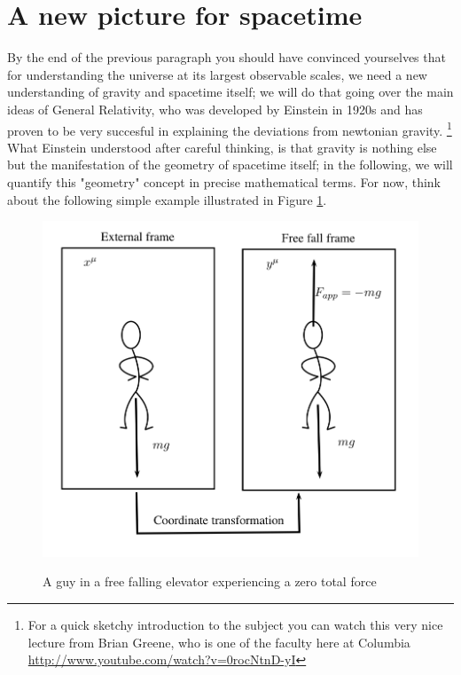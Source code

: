 \section{A new picture for spacetime}
By the end of the previous paragraph you should have convinced yourselves that for understanding the universe at its largest observable scales, we need a new understanding of gravity and spacetime itself; we will do that going over the main ideas of General Relativity, who was developed by Einstein in 1920s and has proven to be very succesful in explaining the deviations from newtonian gravity. \footnote{For a quick sketchy introduction to the subject you can watch this very nice lecture from Brian Greene, who is one of the faculty here at Columbia \url{http://www.youtube.com/watch?v=0rocNtnD-yI}} What Einstein understood after careful thinking, is that gravity is nothing else but the manifestation of the geometry of spacetime itself; in the following, we will quantify this "geometry" concept in precise mathematical terms. For now, think about the following simple example illustrated in Figure \ref{freefall}.  
\begin{figure}
\begin{center}
\includegraphics[scale=0.7]{Draw/Free_fall.png}
\label{}
\end{center}
\caption{A guy in a free falling elevator experiencing a zero total force}
\label{freefall}
\end{figure}
